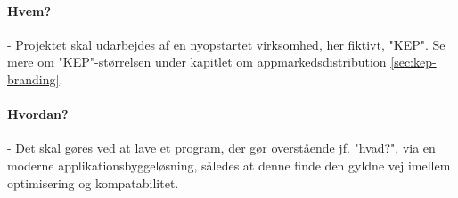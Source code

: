 \paragraph{Hvem?} - Projektet skal udarbejdes af en nyopstartet virksomhed, her fiktivt, "KEP". Se mere om "KEP"-størrelsen under kapitlet om appmarkedsdistribution \ref{sec:kep-branding}.
\paragraph{Hvordan?} - Det skal gøres ved at lave et program, der gør overstående jf. "hvad?", via en moderne applikationsbyggeløsning, således at denne finde den gyldne vej imellem optimisering og kompatabilitet.